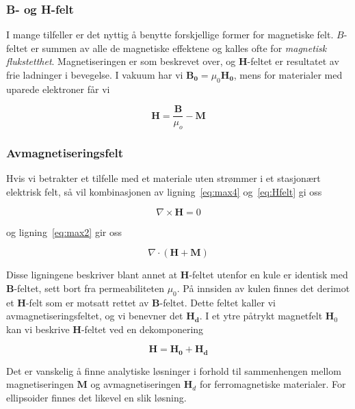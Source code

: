 \documentclass[a4paper,11pt, twocolumn]{article}
\begin{document}
\subsubsection{B- og H-felt}
I mange tilfeller er det nyttig å benytte forskjellige former for magnetiske felt. $B$-feltet er summen av alle de magnetiske effektene og kalles ofte for \textit{magnetisk flukstetthet}. Magnetiseringen er som beskrevet over, og $\mathbf{H}$-feltet er resultatet av frie ladninger i bevegelse. 
I vakuum har vi $\mathbf{B_0} = \mu_0 \mathbf{H_0}$, mens for materialer med uparede elektroner får vi

\begin{equation}
	\mathbf{H}=\frac{\mathbf{B}}{\mu_o}-\mathbf{M}
	\label{eq:Hfelt}
\end{equation}

\subsubsection{Avmagnetiseringsfelt}
Hvis vi betrakter et tilfelle med et materiale uten strømmer i et stasjonært elektrisk felt, så vil kombinasjonen av ligning~\ref{eq:max4} og~\ref{eq:Hfelt} gi oss

\begin{equation}
	\nabla\times\mathbf{H} = 0
	\label{eq:ampereAlternativ}
\end{equation}

og ligning~\ref{eq:max2} gir oss

\begin{equation}
	\nabla\cdot(\mathbf{H}+\mathbf{M})
	\label{eq:gaussAlternativ}
\end{equation}

Disse ligningene beskriver blant annet at $\mathbf H$-feltet utenfor en kule er identisk med $\mathbf B$-feltet, sett bort fra permeabiliteten $\mu_0$. På innsiden av kulen finnes det derimot et $\mathbf H$-felt som er motsatt rettet av $\mathbf B$-feltet. Dette feltet kaller vi avmagnetiseringsfeltet, og vi benevner det $\mathbf{H_d}$. I et ytre påtrykt magnetfelt $\mathbf H_0$ kan vi beskrive $\mathbf H$-feltet ved en dekomponering

\begin{equation}
	\mathbf{H} = \mathbf{H_0} + \mathbf{H_d}
	\label{eq:dekomponering}
\end{equation}



Det er vanskelig å finne analytiske løsninger i forhold til sammenhengen mellom magnetiseringen $\mathbf M$ og avmagnetiseringen $\mathbf H_d$ for ferromagnetiske materialer. For ellipsoider finnes det likevel en slik løsning. 
\end{document}
